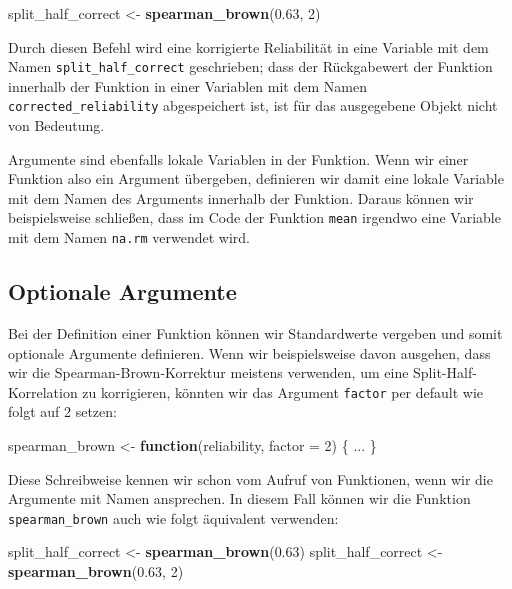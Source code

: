 \documentclass[12pt,]{tufte-book}
\newenvironment{Shaded}{\begin{snugshade}}{\end{snugshade}}
\newcommand{\KeywordTok}[1]{\textcolor[rgb]{0.13,0.29,0.53}{\textbf{#1}}}
\newcommand{\DataTypeTok}[1]{\textcolor[rgb]{0.13,0.29,0.53}{#1}}
\newcommand{\DecValTok}[1]{\textcolor[rgb]{0.00,0.00,0.81}{#1}}
\newcommand{\FloatTok}[1]{\textcolor[rgb]{0.00,0.00,0.81}{#1}}
\newcommand{\StringTok}[1]{\textcolor[rgb]{0.31,0.60,0.02}{#1}}
\newcommand{\ControlFlowTok}[1]{\textcolor[rgb]{0.13,0.29,0.53}{\textbf{#1}}}
\newcommand{\NormalTok}[1]{#1}
\theoremstyle{definition}
\theoremstyle{definition}
\theoremstyle{definition}
\theoremstyle{remark}
\begin{document}
\begin{Shaded}
\begin{Highlighting}[]
\NormalTok{split_half_correct <-}\StringTok{ }\KeywordTok{spearman_brown}\NormalTok{(}\FloatTok{0.63}\NormalTok{, }\DecValTok{2}\NormalTok{)}
\end{Highlighting}
\end{Shaded}

Durch diesen Befehl wird eine korrigierte Reliabilität in eine Variable
mit dem Namen \texttt{split\_half\_correct} geschrieben; dass der
Rückgabewert der Funktion innerhalb der Funktion in einer Variablen mit
dem Namen \texttt{corrected\_reliability} abgespeichert ist, ist für das
ausgegebene Objekt nicht von Bedeutung.

Argumente sind ebenfalls lokale Variablen in der Funktion. Wenn wir
einer Funktion also ein Argument übergeben, definieren wir damit eine
lokale Variable mit dem Namen des Arguments innerhalb der Funktion.
Daraus können wir beispielsweise schließen, dass im Code der Funktion
\texttt{mean} irgendwo eine Variable mit dem Namen \texttt{na.rm}
verwendet wird.

\subsection{Optionale Argumente}\label{optionale-argumente}

Bei der Definition einer Funktion können wir Standardwerte vergeben und
somit optionale Argumente definieren. Wenn wir beispielsweise davon
ausgehen, dass wir die Spearman-Brown-Korrektur meistens verwenden, um
eine Split-Half-Korrelation zu korrigieren, könnten wir das Argument
\texttt{factor} per default wie folgt auf 2 setzen:

\begin{Shaded}
\begin{Highlighting}[]
\NormalTok{spearman_brown <-}\StringTok{ }\ControlFlowTok{function}\NormalTok{(reliability, }\DataTypeTok{factor =} \DecValTok{2}\NormalTok{) \{}
\NormalTok{    ...}
\NormalTok{\}}
\end{Highlighting}
\end{Shaded}

Diese Schreibweise kennen wir schon vom Aufruf von Funktionen, wenn wir
die Argumente mit Namen ansprechen. In diesem Fall können wir die
Funktion \texttt{spearman\_brown} auch wie folgt äquivalent verwenden:

\begin{Shaded}
\begin{Highlighting}[]
\NormalTok{split_half_correct <-}\StringTok{ }\KeywordTok{spearman_brown}\NormalTok{(}\FloatTok{0.63}\NormalTok{)}
\NormalTok{split_half_correct <-}\StringTok{ }\KeywordTok{spearman_brown}\NormalTok{(}\FloatTok{0.63}\NormalTok{, }\DecValTok{2}\NormalTok{)}
\end{Highlighting}
\end{Shaded}
\end{document}
